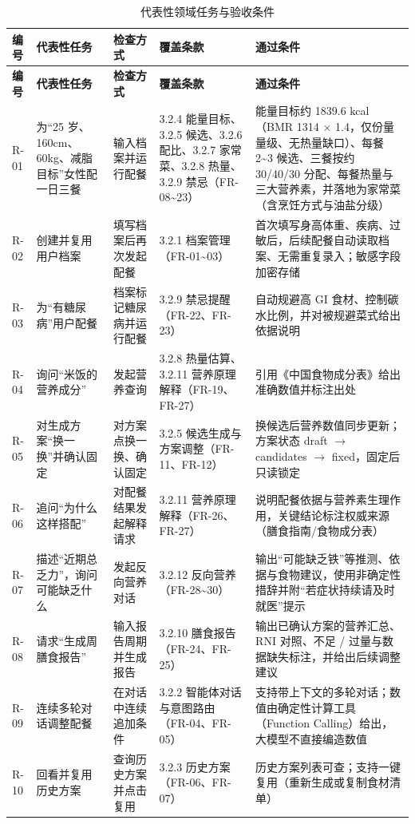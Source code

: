 \documentclass[12pt,a4paper]{ctexart}
\begin{document}
{\small\begin{xltabular}{\linewidth}{P{1.0cm}Q{2.5cm}Q{2.5cm}Q{3cm}L}
\caption{代表性领域任务与验收条件} \\
\toprule
\textbf{编号} & \textbf{代表性任务} & \textbf{检查方式} & \textbf{覆盖条款} & \textbf{通过条件} \\
\midrule
\endfirsthead
\toprule
\textbf{编号} & \textbf{代表性任务} & \textbf{检查方式} & \textbf{覆盖条款} & \textbf{通过条件} \\
\midrule
\endhead
R-01 & 为“25 岁、160cm、60kg、减脂目标”女性配一日三餐 & 输入档案并运行配餐 & 3.2.4 能量目标、3.2.5 候选、3.2.6 配比、3.2.7 家常菜、3.2.8 热量、3.2.9 禁忌（FR-08\textasciitilde{}23） & 能量目标约 1839.6 kcal（BMR 1314 $\times$ 1.4，仅份量量级、无热量缺口）、每餐 2\textasciitilde{}3 候选、三餐按约 30/40/30 分配、每餐热量与三大营养素，并落地为家常菜（含烹饪方式与油盐分级） \\
R-02 & 创建并复用用户档案 & 填写档案后再次发起配餐 & 3.2.1 档案管理（FR-01\textasciitilde{}03） & 首次填写身高体重、疾病、过敏后，后续配餐自动读取档案、无需重复录入；敏感字段加密存储 \\
R-03 & 为“有糖尿病”用户配餐 & 档案标记糖尿病并运行配餐 & 3.2.9 禁忌提醒（FR-22、FR-23） & 自动规避高 GI 食材、控制碳水比例，并对被规避菜式给出依据说明 \\
R-04 & 询问“米饭的营养成分” & 发起营养查询 & 3.2.8 热量估算、3.2.11 营养原理解释（FR-19、FR-27） & 引用《中国食物成分表》给出准确数值并标注出处 \\
R-05 & 对生成方案“换一换”并确认固定 & 对方案点换一换、确认固定 & 3.2.5 候选生成与方案调整（FR-11、FR-12） & 换候选后营养数值同步更新；方案状态 draft $\rightarrow$ candidates $\rightarrow$ fixed，固定后只读锁定 \\
R-06 & 追问“为什么这样搭配” & 对配餐结果发起解释请求 & 3.2.11 营养原理解释（FR-26、FR-27） & 说明配餐依据与营养素生理作用，关键结论标注权威来源（膳食指南/食物成分表） \\
R-07 & 描述“近期总乏力”，询问可能缺乏什么 & 发起反向营养对话 & 3.2.12 反向营养（FR-28\textasciitilde{}30） & 输出“可能缺乏铁”等推测、依据与食物建议，使用非确定性措辞并附“若症状持续请及时就医”提示 \\
R-08 & 请求“生成周膳食报告” & 输入报告周期并生成报告 & 3.2.10 膳食报告（FR-24、FR-25） & 输出已确认方案的营养汇总、RNI 对照、不足 / 过量与数据缺失标注，并给出后续调整建议 \\
R-09 & 连续多轮对话调整配餐 & 在对话中连续追加条件 & 3.2.2 智能体对话与意图路由（FR-04、FR-05） & 支持带上下文的多轮对话；数值由确定性计算工具（Function Calling）给出，大模型不直接编造数值 \\
R-10 & 回看并复用历史方案 & 查询历史方案并点击复用 & 3.2.3 历史方案（FR-06、FR-07） & 历史方案列表可查；支持一键复用（重新生成或复制食材清单） \\
\bottomrule
\end{xltabular}}
\end{document}
